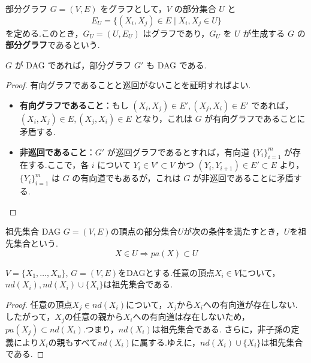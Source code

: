 \documentclass[uplatex, dvipdfmx]{jsarticle}
\begin{document}
\begin{defn}{部分グラフ}
  $G = (V, E)$ をグラフとして，$V$ の部分集合 $U$ と
  \begin{equation}
    E_U = \{ (X_i, X_j) \in E \mid X_i, X_j \in U \}
  \end{equation}
  を定める.このとき，$G_U = (U, E_U)$ はグラフであり，$G_U$ を $U$ が生成する $G$ の\textbf{部分グラフ}であるという.
\end{defn}

\begin{prop}{}
  $G$ が DAG であれば，部分グラフ $G'$ も DAG である.\\
\end{prop}

\begin{proof}
  有向グラフであることと巡回がないことを証明すればよい.
  \begin{itemize}
      \item \textbf{有向グラフであること}：もし $(X_i, X_j) \in E', (X_j, X_i) \in E'$ であれば，$(X_i, X_j) \in E, (X_j, X_i) \in E$ となり，これは $G$ が有向グラフであることに矛盾する.
      \item \textbf{非巡回であること}：$G'$ が巡回グラフであるとすれば，有向道 $\{Y_i\}_{i=1}^m$ が存在する.ここで，各 $i$ について $Y_i \in V' \subset V$ かつ $(Y_i, Y_{i+1}) \in E' \subset E$ より，$\{Y_i\}_{i=1}^m$ は $G$ の有向道でもあるが，これは $G$ が非巡回であることに矛盾する.
  \end{itemize}
\end{proof}

\begin{defn}{祖先集合}
    DAG $G=(V,E)$の頂点の部分集合$U$が次の条件を満たすとき，$U$を祖先集合という.
    \[
       X \in U \Rightarrow pa(X) \subset U 
    \]  
\end{defn}

\begin{prop}[label={prop:AncestorSet}]{}
  $V=\{X_1, \dots, X_n\}$, $G=(V,E)$をDAGとする.任意の頂点$X_i \in V$について，$nd(X_i),nd(X_i) \cup \{X_i\}$は祖先集合である.
\end{prop}

\begin{proof}
  任意の頂点$X_j \in nd(X_i)$について，$X_j$から$X_i$への有向道が存在しない.
  したがって，$X_j$の任意の親から$X_i$への有向道は存在しないため，$pa(X_j) \subset nd(X_i)$.つまり，$nd(X_i)$は祖先集合である.
  さらに，非子孫の定義により$X_i$の親もすべて$nd(X_i)$に属する.ゆえに，$nd(X_i) \cup \{X_i\}$は祖先集合である.
\end{proof}
\end{document}
